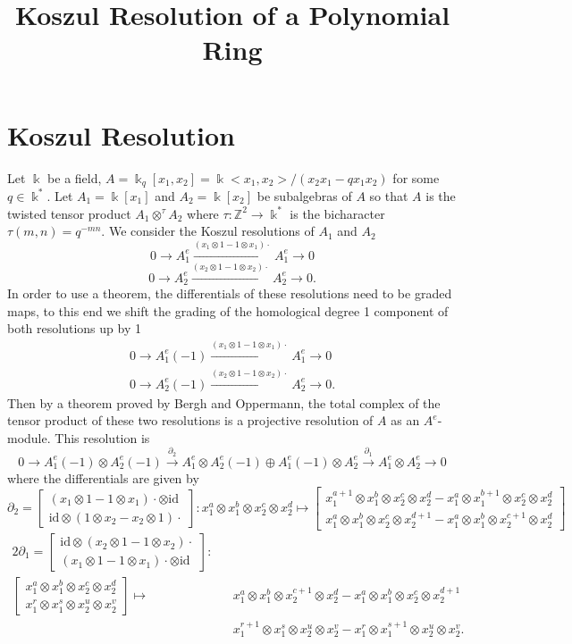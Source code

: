 \documentclass[12pt,a4paper]{article}
\title{Koszul Resolution of a Polynomial Ring}
\date{}
\newcommand\ZZ{\mathbb{Z}}
\newcommand{\kk}{\Bbbk}
\newcommand\1{_{(1)}}
\newcommand\2{_{(2)}}
\begin{document}
\maketitle

\section{Koszul Resolution}

Let $\kk$ be a field, $A=\kk_q[x_1,x_2]=\kk<x_1,x_2>/(x_2x_1-qx_1x_2)$ for some $q\in\kk^*$.
Let $A_1=\kk[x_1]$ and $A_2=\kk[x_2]$ be subalgebras of $A$ so that $A$ is the twisted tensor product $A_1\otimes^\tau A_2$ where $\tau:\ZZ^2\to\kk^*$ is the bicharacter $\tau(m,n)= q^{-mn}$.
We consider the Koszul resolutions of $A_1$ and $A_2$
\[
  0\to A_1^e\xrightarrow{(x_1\otimes 1-1\otimes x_1)\cdot}A_1^e\to 0
\]
\[
0\to A_2^e\xrightarrow{(x_2\otimes 1-1\otimes x_2)\cdot}A_2^e\to 0.  
\]
In order to use a theorem, the differentials of these resolutions need to be graded maps, to this end we shift the grading of the homological degree 1 component of both resolutions up by 1
\begin{align*}
0\to A_1^e(-1)\xrightarrow{(x_1\otimes 1-1\otimes x_1)\cdot}A_1^e\to 0\\
0\to A_2^e(-1)\xrightarrow{(x_2\otimes 1-1\otimes x_2)\cdot}A_2^e\to 0.  
\end{align*}
Then by a theorem proved by Bergh and Oppermann, the total complex of the tensor product of these two resolutions is a projective resolution of $A$ as an $A^e$-module.
This resolution is 
\[
0\to A_1^e(-1)\otimes A_2^e(-1)\xrightarrow{\partial_2}A_1^e\otimes A_2^e(-1)\oplus A_1^e(-1)\otimes A_2^e\xrightarrow{\partial_1}A_1^e\otimes A_2^e\to 0
\]
where the differentials are given by
\[
\partial_2=\begin{bmatrix}(x_1\otimes 1-1\otimes x_1)\cdot\otimes \text{id}\\\text{id}\otimes(1\otimes x_2-x_2\otimes 1)\cdot\end{bmatrix}:x_1^a\otimes x_1^b\otimes x_2^c\otimes x_2^d\mapsto\begin{bmatrix}x_1^{a+1}\otimes x_1^b\otimes x_2^c\otimes x_2^d-x_1^a\otimes x_1^{b+1}\otimes x_2^c\otimes x_2^d\\ x_1^a\otimes x_1^b\otimes x_2^c\otimes x_2^{d+1}-x_1^a\otimes x_1^b\otimes x_2^{c+1}\otimes x_2^d\end{bmatrix}
\]
\begin{alignat*}{2}
\partial_1=\begin{bmatrix}\text{id}\otimes(x_2\otimes 1-1\otimes x_2)\cdot\\(x_1\otimes 1-1\otimes x_1)\cdot\otimes\text{id}\end{bmatrix}:\\
\begin{bmatrix}x_1^a\otimes x_1^b\otimes x_2^c\otimes x_2^d\\x_1^r\otimes x_1^s\otimes x_2^u\otimes x_2^v\end{bmatrix}\mapsto &&x_1^a\otimes x_1^b\otimes x_2^{c+1}\otimes x_2^d-x_1^a\otimes x_1^b\otimes x_2^c\otimes x_2^{d+1}\\
&& x_1^{r+1}\otimes x_1^s\otimes x_2^u\otimes x_2^v-x_1^r\otimes x_1^{s+1}\otimes x_2^u\otimes x_2^v.
\end{alignat*}
\end{document}
